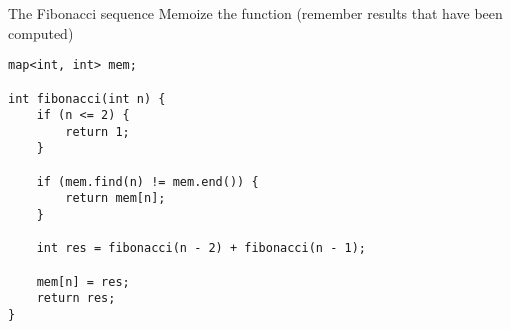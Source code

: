 

   \begin{frame}[fragile]{The Fibonacci sequence}
 Memoize the function (remember results that have been computed)
    \begin{lstlisting}
map<int, int> mem;

int fibonacci(int n) {
    if (n <= 2) {
        return 1;
    }

    if (mem.find(n) != mem.end()) {
        return mem[n];
    }

    int res = fibonacci(n - 2) + fibonacci(n - 1);

    mem[n] = res;
    return res;
}
    \end{lstlisting}

\end{frame}

